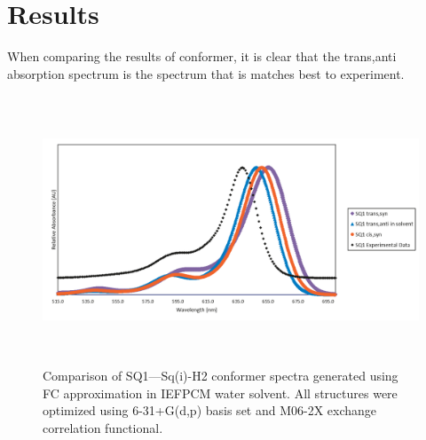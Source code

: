 \documentclass[journal=jacsat,manuscript=article]{achemso}
\begin{document}
\section{Results}
When comparing the results of conformer, it is clear that the trans,anti absorption spectrum is the spectrum that is matches best to experiment. 
\begin{figure}[h]
    \centering
    \includegraphics[width=15cm,height=8cm]{figures/sq1_conformer_exp.png}
    \caption{Comparison of SQ1—Sq(i)-H2 conformer spectra generated using FC approximation in IEFPCM water solvent. All structures were optimized  using 6-31+G(d,p) basis set and M06-2X exchange correlation functional.}
    \label{fig:my_label}
\end{figure}
\end{document}
